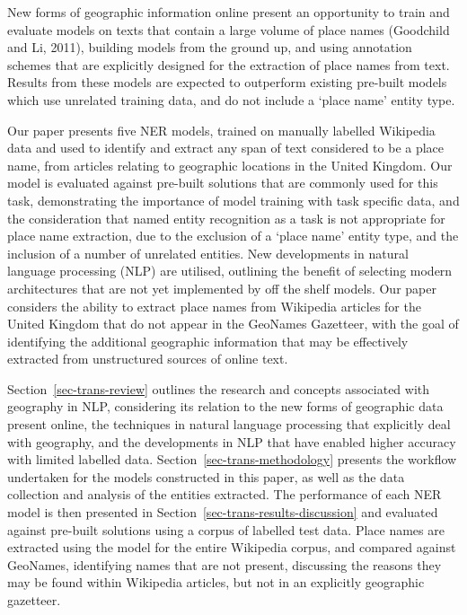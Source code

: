 \documentclass[
  letterpaper,
  11pt,
  english,
  onehalfspacing,
  headsepline]{MastersDoctoralThesis}
\begin{document}
New forms of geographic information online present an opportunity to
train and evaluate models on texts that contain a large volume of place
names (Goodchild and Li, 2011), building models from the ground up, and
using annotation schemes that are explicitly designed for the extraction
of place names from text. Results from these models are expected to
outperform existing pre-built models which use unrelated training data,
and do not include a `place name' entity type.

Our paper presents five NER models, trained on manually labelled
Wikipedia data and used to identify and extract any span of text
considered to be a place name, from articles relating to geographic
locations in the United Kingdom. Our model is evaluated against
pre-built solutions that are commonly used for this task, demonstrating
the importance of model training with task specific data, and the
consideration that named entity recognition as a task is not appropriate
for place name extraction, due to the exclusion of a `place name' entity
type, and the inclusion of a number of unrelated entities. New
developments in natural language processing (NLP) are utilised,
outlining the benefit of selecting modern architectures that are not yet
implemented by off the shelf models. Our paper considers the ability to
extract place names from Wikipedia articles for the United Kingdom that
do not appear in the GeoNames Gazetteer, with the goal of identifying
the additional geographic information that may be effectively extracted
from unstructured sources of online text.

Section~\ref{sec-trans-review} outlines the research and concepts
associated with geography in NLP, considering its relation to the new
forms of geographic data present online, the techniques in natural
language processing that explicitly deal with geography, and the
developments in NLP that have enabled higher accuracy with limited
labelled data. Section~\ref{sec-trans-methodology} presents the workflow
undertaken for the models constructed in this paper, as well as the data
collection and analysis of the entities extracted. The performance of
each NER model is then presented in
Section~\ref{sec-trans-results-discussion} and evaluated against
pre-built solutions using a corpus of labelled test data. Place names
are extracted using the model for the entire Wikipedia corpus, and
compared against GeoNames, identifying names that are not present,
discussing the reasons they may be found within Wikipedia articles, but
not in an explicitly geographic gazetteer.
\end{document}
